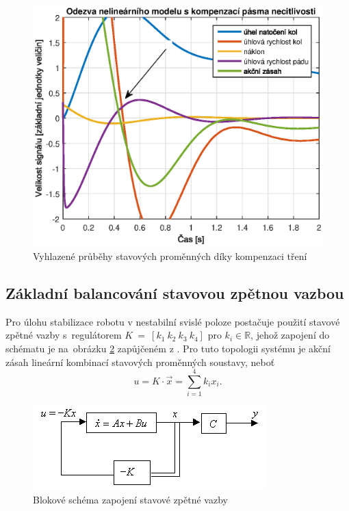 \documentclass[conference]{IEEEtran}
\begin{document}
\begin{figure}[htbp]
    \centerline{\includegraphics[width=\linewidth]{regulace_kompenzace_treni.eps}}
    \caption{Vyhlazené průběhy stavových proměnných díky kompenzaci tření}
    \label{fig:kompenzace_treni}        
\end{figure}

\subsection{Základní balancování stavovou zpětnou vazbou}
Pro úlohu stabilizace robotu v nestabilní svislé poloze postačuje použití stavové zpětné vazby s~regulátorem $K~=~\left[ k_1 ~ k_2 ~ k_3 ~ k_4 \right]$
pro $k_i \in \mathbb{R}$, jehož zapojení do schématu je na~obrázku \ref{fig:stavova_zv} zapůjčeném z \cite{img:full_state_feedback}.
Pro tuto topologii systému je akční zásah lineární kombinací stavových proměnných soustavy, neboť
\begin{equation}
    u = K \cdot \vec{x} = \sum_{i=1}^4 k_i x_i.
\end{equation}

\begin{figure}[htbp]
    \centerline{\includegraphics[width=\linewidth]{full_state_feedback_schematic.png}}
    \caption{Blokové schéma zapojení stavové zpětné vazby}
    \label{fig:stavova_zv}        
\end{figure}
\end{document}
